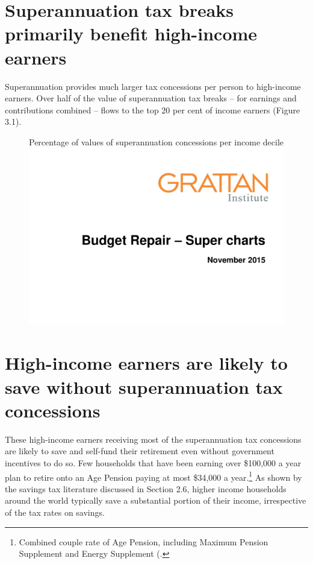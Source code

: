 \documentclass{grattanAlpha}
\begin{document}
\section{Superannuation tax breaks primarily benefit high-income earners}
Superannuation provides much larger tax concessions per person to high-income earners. Over half of the value of superannuation tax breaks – for earnings and contributions combined – flows to the top 20 per cent of income earners (Figure 3.1). 
\begin{figure}
%
{Percentage of values of superannuation concessions per income decile}\label{fig:SUPER-3-1}
\includegraphics[width=\columnwidth,page=10]{super-atlas/PPTX.pdf}

\end{figure}
\section{High-income earners are likely to save without superannuation tax concessions}\label{sec:SUPER-3-2}
These high-income earners receiving most of the superannuation tax concessions are likely to save and self-fund their retirement even without government incentives to do so. Few households that have been earning over \$100,000 a year plan to retire onto an Age Pension paying at most \$34,000 a year.\footnote{Combined couple rate of Age Pension, including Maximum Pension Supplement and Energy Supplement (\textcite{DHS2015IncomeTestForPensions}.}  As shown by the savings tax literature discussed in Section 2.6, higher income households around the world typically save a substantial portion of their income, irrespective of the tax rates on savings. 
\end{document}

